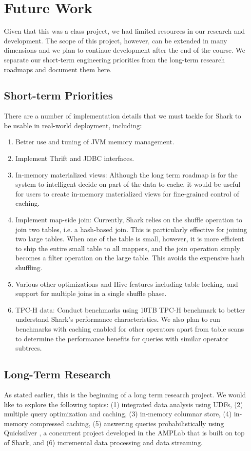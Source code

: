 
\section{Future Work}
\label{sec:future}

Given that this was a class project, we had limited resources in our research and development. The scope of this project, however, can be extended in many dimensions and we plan to continue development after the end of the course. We separate our short-term engineering priorities from the long-term research roadmaps and document them here.

\subsection{Short-term Priorities}
There are a number of implementation details that we must tackle for Shark to be usable in real-world deployment, including:
\begin{enumerate}
    \item Better use and tuning of JVM memory management.
	\item Implement Thrift and JDBC interfaces.
	\item In-memory materialized views: Although the long term roadmap is for the system to intelligent decide on part of the data to cache, it would be useful for users to create in-memory materialized views for fine-grained control of caching.
	\item Implement map-side join: Currently, Shark relies on the shuffle operation to join two tables, i.e. a hash-based join. This is particularly effective for joining two large tables. When one of the table is small, however, it is more efficient to ship the entire small table to all mappers, and the join operation simply becomes a filter operation on the large table. This avoids the expensive hash shuffling.
	\item Various other optimizations and Hive features including table locking, and support for multiple joins in a single shuffle phase.
	\item TPC-H data: Conduct benchmarks using 10TB TPC-H benchmark to better understand Shark's performance characteristics. We also plan to run benchmarks with caching enabled for other operators apart from table scans to determine the performance benefits for queries with similar operator subtrees. 
\end{enumerate}


\subsection{Long-Term Research}
As stated earlier, this is the beginning of a long term research project. We would like to explore the following topics: (1) integrated data analysis using UDFs, (2) multiple query optimization and caching, (3) in-memory columnar store, (4) in-memory compressed caching, (5) answering queries probabilistically using Quicksilver \cite{quicksilverdb}, a concurrent project developed in the AMPLab that is built on top of Shark, and (6) incremental data processing and data streaming. 

